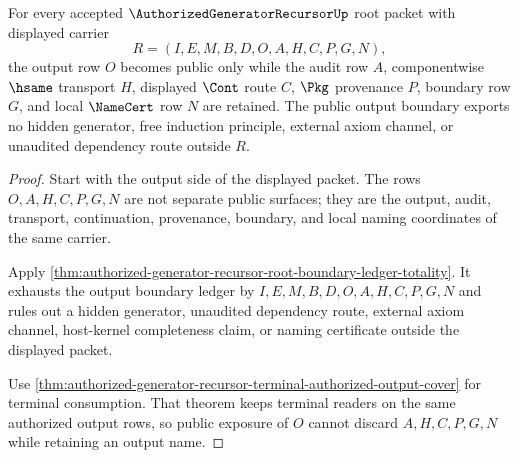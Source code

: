 \begin{theorem}
\label{thm:authorized-generator-recursor-output-boundary-totality}
For every accepted $\AuthorizedGeneratorRecursorUp$ root packet with displayed carrier
$$
R=(I,E,M,B,D,O,A,H,C,P,G,N),
$$
the output row $O$ becomes public only while the audit row $A$, componentwise $\hsame$ transport $H$, displayed $\Cont$ route $C$, $\Pkg$ provenance $P$, boundary row $G$, and local $\NameCert$ row $N$ are retained. The public output boundary exports no hidden generator, free induction principle, external axiom channel, or unaudited dependency route outside $R$.
\end{theorem}
\begin{proof}
Start with the output side of the displayed packet. The rows $O,A,H,C,P,G,N$ are not separate public surfaces; they are the output, audit, transport, continuation, provenance, boundary, and local naming coordinates of the same carrier.

Apply \autoref{thm:authorized-generator-recursor-root-boundary-ledger-totality}. It exhausts the output boundary ledger by $I,E,M,B,D,O,A,H,C,P,G,N$ and rules out a hidden generator, unaudited dependency route, external axiom channel, host-kernel completeness claim, or naming certificate outside the displayed packet.

Use \autoref{thm:authorized-generator-recursor-terminal-authorized-output-cover} for terminal consumption. That theorem keeps terminal readers on the same authorized output rows, so public exposure of $O$ cannot discard $A,H,C,P,G,N$ while retaining an output name.
\end{proof}

